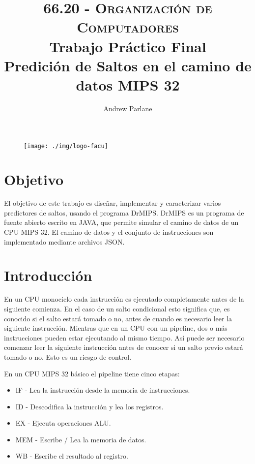 \documentclass[a4paper]{article}
\begin{document}
\begin{figure}
\centering
\texttt{[image: ./img/logo-facu]}
\end{figure}

\title{\large\textsc{66.20 - Organización de Computadores}\\
\large Trabajo Práctico Final\\
Predición de Saltos en el camino de datos MIPS 32}

\author{
Andrew Parlane \\
}

\maketitle

\newpage

\tableofcontents

\listoffigures

\newpage

\section{Objetivo}

El objetivo de este trabajo es diseñar, implementar y caracterizar varios predictores de saltos, usando el programa DrMIPS. DrMIPS es un programa de fuente abierto escrito en JAVA, que permite simular el camino de datos de un CPU MIPS 32. El camino de datos y el conjunto de instrucciones son implementado mediante archivos JSON.

\section{Introducción}

En un CPU monociclo cada instrucción es ejecutado completamente antes de la siguiente comienza. En el caso de un salto condicional esto significa que, es conocido si el salto estará tomado o no, antes de cuando es necesario leer la siguiente instrucción. Mientras que en un CPU con un pipeline, dos o más instrucciones pueden estar ejecutando al mismo tiempo. Así puede ser necesario comenzar leer la siguiente instrucción antes de conocer si un salto previo estará tomado o no. Esto es un riesgo de control.

En un CPU MIPS 32 básico el pipeline tiene cinco etapas:

\begin{itemize}
\item IF - Lea la instrucción desde la memoria de instrucciones.
\item ID - Descodifica la instrucción y lea los registros.
\item EX - Ejecuta operaciones ALU.
\item MEM - Escribe / Lea la memoria de datos.
\item WB - Escribe el resultado al registro.
\end{itemize}
\end{document}
